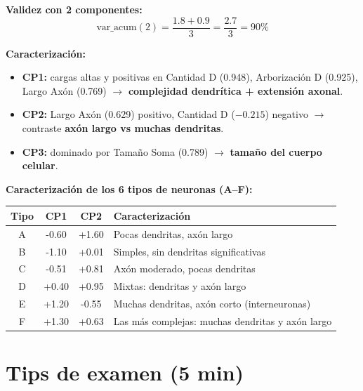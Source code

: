 \documentclass[11pt,a4paper]{article}
\begin{document}
\textbf{Validez con 2 componentes:}
\[
\mathrm{var\_acum}(2) = \frac{1.8+0.9}{3} = \frac{2.7}{3} = \boxed{90\%}
\]

\textbf{Caracterización:}
\begin{itemize}[leftmargin=*]
    \item \textbf{CP1:} cargas altas y positivas en Cantidad D (0.948), Arborización D (0.925), Largo Axón (0.769) $\to$ \textbf{complejidad dendrítica + extensión axonal}.
    \item \textbf{CP2:} Largo Axón (0.629) positivo, Cantidad D ($-0.215$) negativo $\to$ contraste \textbf{axón largo vs muchas dendritas}.
    \item \textbf{CP3:} dominado por Tamaño Soma (0.789) $\to$ \textbf{tamaño del cuerpo celular}.
\end{itemize}

\textbf{Caracterización de los 6 tipos de neuronas (A--F):}
\begin{center}\small
\begin{tabular}{cccp{6cm}}
\toprule
Tipo & CP1 & CP2 & Caracterización \\
\midrule
A & -0.60 & +1.60 & Pocas dendritas, axón largo \\
B & -1.10 & +0.01 & Simples, sin dendritas significativas \\
C & -0.51 & +0.81 & Axón moderado, pocas dendritas \\
D & +0.40 & +0.95 & Mixtas: dendritas y axón largo \\
E & +1.20 & -0.55 & Muchas dendritas, axón corto (interneuronas) \\
F & +1.30 & +0.63 & Las más complejas: muchas dendritas y axón largo \\
\bottomrule
\end{tabular}
\end{center}

\section{Tips de examen (5 min)}
\end{document}
